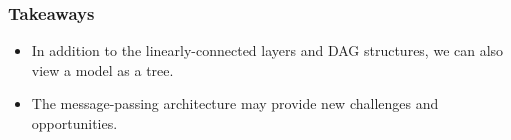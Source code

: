 \documentclass[12pt,aspectratio=169]{beamer}
\begin{document}
    \begin{frame}
        \frametitle{Takeaways}

        \begin{itemize}
            \setlength{\itemsep}{.8em}
            \item In addition to the linearly-connected layers and DAG structures, we can also view a model as a tree.
            \item The message-passing architecture may provide new challenges and opportunities.
        \end{itemize}
    \end{frame}

    \appendix

\end{document}
